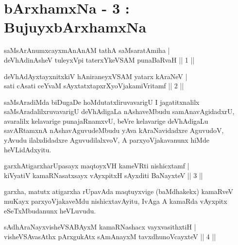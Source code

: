 


\chapter{bArxhamxNa - 3 : BujuyxbArxhamxNa}

\begin{shl}
saMsArAnumxcayxmAnAnAM tathA saMsaratAmiha |\\
deVhAdinAsheV tuleyxV\s pi taterxYkeVSAM punaBaRvaH \hfill || 1 ||
\end{shl}

\begin{shl}
deVhAdAyxtayxnitxkiV hAniraneyxVSAM yatarx kAraNeV |\\
sati cAsati ceYvaM sAyxtatxtapxrXyoVjakamiVritamf \hfill || 2 ||
\end{shl}

\begin{artha}
saMsAradiMda biDugaDe hoMdutatxliruvavarigU I jagatitxnalilx saMsAradalilxruvavarigU deVhAdigaLa nAshaveMbudu samAnavAgidadxrU, avaralilx kelavarige punajaRnamxvU, beVre kelavarige deVhAdigaLu savARtamxnA nAshavAguvudeMbudu yAva kAraNavidadxre AguvudoV, yAvudu ilalxdidadxre AguvudilalxvoV, A parxyoVjakavanunx hiMde heVLidAdxyitu.
\end{artha}


\begin{shl}
garxhAtigarxharUpasayx maqtoyxVH kameVRti nishicxtamf |\\
kiVyatiV kamaRNasatxsayx vAyxpitxH sAyxditi BaNayxteV \hfill || 3 ||
\end{shl}

\begin{artha}
garxha, matutx atigarxha rUpavAda maqtuyxvige (baMdhakekx) kamaRveV muKayx parxyoVjakaveMdu nishicxtavAyitu, IvAga A kamaRda vAyxpitx eSeTxMbudanunx heVLuvudu.
\end{artha}

\begin{shl}
sAdhAraNayxvisheVSABAyxM kamaRNashacx vayxvasithxtiH |\\
visheVSAvasAthx pArxgukAtx sAmAnayxM tavxdhunoVcayxteV \hfill || 4 ||
\end{shl}

